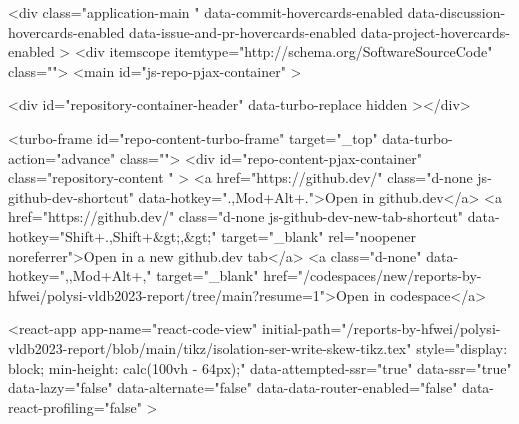 {{  <div
    class="application-main "
    data-commit-hovercards-enabled
    data-discussion-hovercards-enabled
    data-issue-and-pr-hovercards-enabled
    data-project-hovercards-enabled
  >
        <div itemscope itemtype="http://schema.org/SoftwareSourceCode" class="">
    <main id="js-repo-pjax-container" >
      
      
    

    






    
  <div id="repository-container-header" data-turbo-replace hidden ></div>




<turbo-frame id="repo-content-turbo-frame" target="_top" data-turbo-action="advance" class="">
    <div id="repo-content-pjax-container" class="repository-content " >
      <a href="https://github.dev/" class="d-none js-github-dev-shortcut" data-hotkey=".,Mod+Alt+.">Open in github.dev</a>
  <a href="https://github.dev/" class="d-none js-github-dev-new-tab-shortcut" data-hotkey="Shift+.,Shift+&gt;,&gt;" target="_blank" rel="noopener noreferrer">Open in a new github.dev tab</a>
    <a class="d-none" data-hotkey=",,Mod+Alt+," target="_blank" href="/codespaces/new/reports-by-hfwei/polysi-vldb2023-report/tree/main?resume=1">Open in codespace</a>




    
      
    








<react-app
  app-name="react-code-view"
  initial-path="/reports-by-hfwei/polysi-vldb2023-report/blob/main/tikz/isolation-ser-write-skew-tikz.tex"
    style="display: block; min-height: calc(100vh - 64px);"
  data-attempted-ssr="true"
  data-ssr="true"
  data-lazy="false"
  data-alternate="false"
  data-data-router-enabled="false"
  data-react-profiling="false"
>
  
}}
